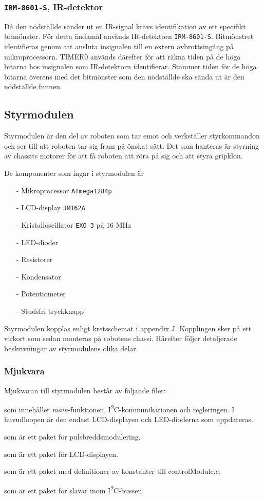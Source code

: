 \documentclass[11pt]{article}
\begin{document}
\begin{flushleft}
\subsubsection{\texttt{IRM-8601-S}, IR-detektor}
Då den nödställde sänder ut en IR-signal krävs identifikation av ett specifikt bitmönster. För detta ändamål används IR-detektorn \verb+IRM-8601-S+. Bitmönstret identifieras genom att ansluta insignalen till en extern avbrottsingång på mikroprocessorn. TIMER0 används därefter för att räkna tiden på de höga bitarna hos insignalen som IR-detektorn identifierar. Stämmer tiden för de höga bitarna överens med det bitmönster som den nödställde ska sända ut är den nödställde funnen.

\subsection{Styrmodulen}

Styrmodulen är den del av roboten som tar emot och verkställer styrkommandon och ser till att roboten tar sig fram på önskat sätt. Det som hanteras är styrning av chassits motorer för att få roboten att röra på sig och att styra gripklon. 

De komponenter som ingår i styrmodulen är
\begin{itemize}
  \item[-] Mikroprocessor \verb+ATmega1284p+
  \item[-] LCD-display \verb+JM162A+
  \item[-] Kristalloscillator \verb+EXO-3+ på $16$ MHz
  \item[-] LED-dioder
  \item[-] Resistorer
  \item[-] Kondensator
  \item[-] Potentiometer
  \item[-] Studsfri tryckknapp
\end{itemize}

Styrmodulen kopplas enligt kretsschemat i appendix J. Kopplingen sker på ett virkort som sedan monteras på robotens chassi. Härefter följer detaljerade beskrivningar av styrmodulens olika delar.

\subsubsection{Mjukvara}
Mjukvaran till styrmodulen består av följande filer:
\begin{description}[style=unboxed, leftmargin=0cm]
  \item[controlModule.c] som innehåller \textit{main}-funktionen, I\textsuperscript{2}C-kommunikationen och regleringen. I huvudloopen är den endast LCD-displayen och LED-dioderna som uppdateras.
  \item[PWM.h] som är ett paket för pulsbreddsmodulering.
  \item[LCD.h] som är ett paket för LCD-displayen.
  \item[constants.h] som är ett paket med definitioner av konstanter till controlModule.c.
  \item[I2C\_slave.h] som är ett paket för slavar inom I\textsuperscript{2}C-bussen.


\end{description}
\end{flushleft}
\end{document}
